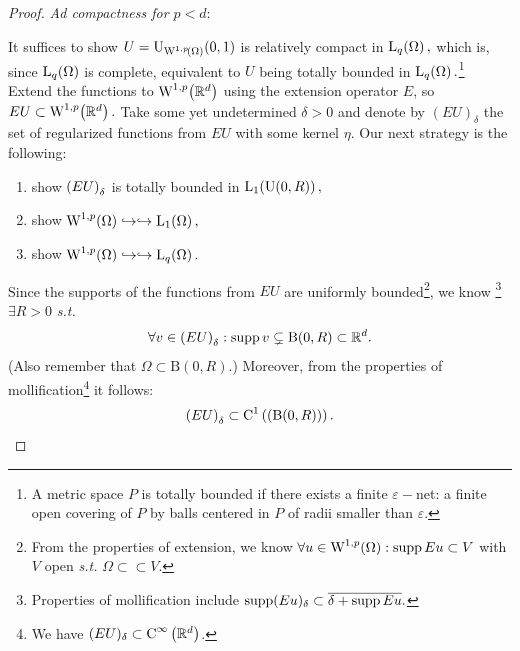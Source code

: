 \documentclass{article}
\begin{document}
\begin{proof}
	\textit{Ad compactness for $p<d$}:

	It suffices to show $U = \text{U}_{\WkpSet[1][p]{\Omega}}(0,1)$ is relatively compact in $\LpSet[q]{\Omega},$ which is, since $\LpSet[q]{\Omega}$ is complete, equivalent to $U$ being totally bounded in $\LpSet[q]{\Omega}.$\footnote{A metric space $P$ is totally bounded if there exists a finite $\varepsilon-$net: a finite open covering of $P$ by balls centered in $P$ of radii smaller than $\varepsilon$.} Extend the functions to $\WkpSet[1][p]{\R^{d}}$ using the extension operator $E$, so $EU \subset \WkpSet[1][p]{\R^{d}}.$ Take some yet undetermined $\delta>0$ and denote by $(EU)_{\delta}$ the set of regularized functions from $EU$ with some kernel $\eta$. Our next strategy is the following:

	\begin{enumerate}
		\item show $\qty(EU)_{\delta}$ is totally bounded in $\LpSet[1]{\text{U}(0,R)},$
		\item show $\WkpSet[1][p]{\Omega} \hookrightarrow \hookrightarrow \LpSet[1]{\Omega},$
		\item show $\WkpSet[1][p]{\Omega} \hookrightarrow \hookrightarrow \LpSet[q]{\Omega}.$
	\end{enumerate}

	Since the supports of the functions from $EU$ are uniformly bounded\footnote{From the properties of extension, we know $ \forall u \in \WkpSet[1][p]{\Omega}:\supp Eu \subset V$ with $V$ open \textit{s.t.} $\Omega \subset \subset V.$}, we know \footnote{Properties of mollification include $\operatorname{supp} (Eu)_{\delta} \subset \overline{\delta + \operatorname{supp} Eu}.$} $\exists R>0$ \textit{s.t.}
	\[
		\forall v \in \qty(EU)_{\delta}: \operatorname{supp} v \subsetneq \text{B}(0,R) \subset {\mathbb R}^d.
	\]
	(Also remember that $\Omega \subset \text{B}(0,R).$)
	Moreover, from the properties of mollification\footnote{We have $(EU)_{\delta} \subset \text{C}^{\infty}\!\,\left({\mathbb R}^{d} \right)$.} it follows: 
	\[
		\qty(EU)_{\delta} \subset \text{C}^{1}\!\,\left(\qty(\text{B}(0,R)) \right).
	\]


\end{proof}
\end{document}
